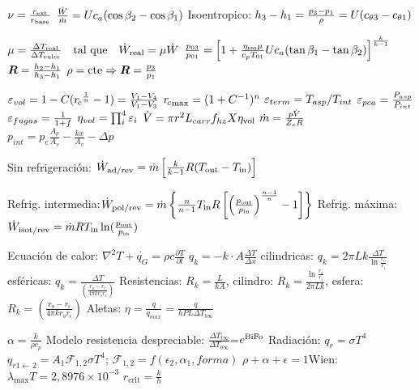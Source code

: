 \formuleoseparator

\begin{formuleo}[Axiales]
$\nu = \frac{r_{\mathrm{ext}}}{r_{\mathrm{base}}}$ \separar $ \frac{\dot{W}}{\dot{m}} = U c_{a } (\cos\beta_2 - \cos\beta_1 )$ \separar Isoentropico: $h_3 - h_1 = \frac{p_3 -p_1}{\rho}=U (c_{\theta 3}-c_{\theta 1})$ \separar

$\mu = \frac{\Delta {T_{\mathrm{real}}}}{\Delta {T_{\mathrm{euler}}}} \quad \text{tal que} \quad {\dot{W}_{\mathrm{real}}} = \mu \dot{W}$ \separar $\frac{p_{03}}{p_{01}} = \left[1 + \frac{\eta_{\mathrm{iso}} \mu}{{c_p} T_{01}}U c_{a } (\tan \beta_1 - \tan \beta_2) \right]^{\frac{k}{k-1}}$ \separar ${\bm{R}} = \frac{h_2 - h_1}{h_3 - h_1}$ \going $\rho = \textrm{cte} \Rightarrow {\bm{R}} = \frac{p_3}{p_1}$ 
\end{formuleo}

\formuleoseparator

\begin{formuleo}[Alternativos]
$\varepsilon_{vol}=1-C({r_{\!c}}^{\frac{1}{n}} -1)=\frac{V_1 - V_4}{V_1 - V_3}$ \separar 
${r_{\!c}}_{\max} = (1+C^{-1})^n$ \separar
$\varepsilon_{term}=T_{asp}/T_{int}$ \separar $\varepsilon_{pca}=\frac{P_{asp}}{P_{int}}$ \separar $ \varepsilon_{fugas} = \frac{1}{1+f}$ \separar$ \eta_{vol}=\prod_i^4 \varepsilon_i$ \separar $\dot{V} = \pi r^2 L_{carr} f_{hz} X {\eta_{\mathrm{vol}}}$ \separar $\dot{m} = \frac{p \dot{V}}{Z_e R}$ \separar $p_{int} = p_e \frac{A_p}{A_v}-\frac{kx}{A_v}-\Delta p$
\end{formuleo}
\formuleoseparator
\begin{formuleo}[Refrigeración]
Sin refrigeración: $\dot{W}_{\mathrm{ad/rev}} = \dot{m} \left[\frac{k}{k-1}R(T_{\mathrm{out}}-T_{\mathrm{in}}) \right]$ \separar 

Refrig. intermedia:$\dot{W}_{\mathrm{pol/rev}}=\dot{m} \left\{ \frac{n}{n-1} T_{\mathrm{in}} R \left[ \left(\frac{p_{\mathrm{out}}}{p_{\mathrm{in}}}\right)^{\frac{n-1}{n}} -1\right] \right\}$ \separar Refrig. máxima: $\dot{W}_{\mathrm{isot/rev}}=\dot{m} R T_{\mathrm{in}} \ln(\frac{p_{\mathrm{out}}}{p_{\mathrm{in}}})$
\end{formuleo}
\formuleoseparator
\begin{formuleo}[TdC]
Ecuación de calor: $\nabla^2T+\Dot{q_G}=\rho c \frac{\partial T}{\partial t}$ \separar
$q_k=-k\cdot A\frac{\Delta T}{\Delta x} $ \separar cilindricas: $q_k=2\pi Lk\frac{\Delta T}{\ln{\frac{r_o}{r_i}}}$ \separar esféricas: $q_k=\frac{\Delta T}{\left(\frac{r_o - r_i}{4\pi k r_o r_i}\right)}$ \separar Resistencias: $R_k=\frac{L}{kA}$, cilindro: $R_k=\frac{\ln{\frac{r_o}{r_i}}}{2\pi Lk}$, esfera: $R_k={\left(\frac{r_o - r_i}{4\pi k r_o r_i}\right)}$ \separar Aletas: $\eta=\frac{q}{q_{max}}=\frac{q}{hPL\Delta T_{b\infty}}$ \separar

$\alpha =\frac{k}{\rho c_p}$ \separar Modelo resistencia despreciable: $ \frac{\Delta T_{t\infty}}{\Delta T_{0\infty}}$=$e^{\mathrm{Bi}\mathrm{Fo}}$ \separar Radiación: $q_r=\sigma T^4$ \separar$q_{r 1\leftarrow 2}=A_1 \mathcal{F}_{1,2} \sigma  T^4$;  $\mathcal{F}_{1,2}=f(\epsilon_2, \alpha_1 ,forma) $ \separar$\rho + \alpha + \epsilon =1$\separar Wien: $\lambda_{\max} T = 2,8976\times 10^{-3}$ \separar $r_{\mathrm{crit}}=\frac{k}{h}$
\end{formuleo}

